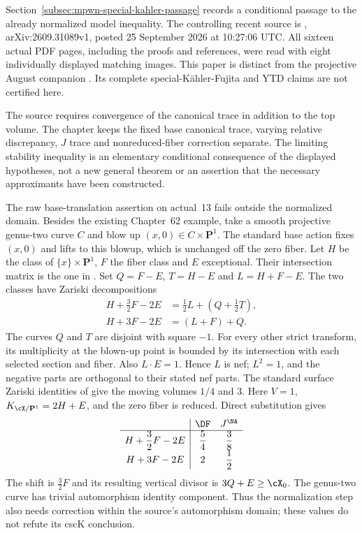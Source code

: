 Section~\ref{subsec:mpwn-special-kahler-passage} records a
conditional passage to the already normalized model inequality.
The controlling recent source is \cite{Trusiani26TranscendentalV1},
arXiv:\allowbreak 2609.31089v1, posted 25 September 2026 at
10:27:06 UTC. All sixteen actual PDF pages, including the
proofs and references, were read with eight individually displayed
matching images. This paper is distinct from the projective
August companion \cite{Trusiani26}. Its complete special-K\"ahler-Fujita
and YTD claims are not certified here.

The source requires convergence of the canonical trace in
addition to the top volume. The chapter keeps the fixed base
canonical trace, varying relative discrepancy, $J$ trace and
nonreduced-fiber correction separate. The limiting stability
inequality is an elementary conditional consequence of the
displayed hypotheses, not a new general theorem or an assertion
that the necessary approximants have been constructed.

The raw base-translation assertion on actual~13 fails outside
the normalized domain. Besides the existing Chapter~62 example,
take a smooth projective genus-two curve $C$ and blow up
$(x,0)\in C\times\mathbf P^1$. The standard base action fixes
$(x,0)$ and lifts to this blowup, which is unchanged off the
zero fiber. Let $H$ be the class of $\{x\}\times\mathbf P^1$,
$F$ the fiber class and $E$ exceptional.
Their intersection matrix is the one in
.
Set $Q=F-E$, $T=H-E$ and $L=H+F-E$. The two classes have
Zariski decompositions
\[
 \begin{aligned}
 H+\tfrac32F-2E&=\tfrac12L+(Q+\tfrac12T),\\
 H+3F-2E&=(L+F)+Q.
 \end{aligned}
\]
The curves $Q$ and $T$ are disjoint with square $-1$.
For every other strict transform, its multiplicity at the blown-up
point is bounded by its intersection with each selected section
and fiber. Also $L\cdot E=1$. Hence $L$ is nef; $L^2=1$, and the negative parts
are orthogonal to their stated nef parts. The standard surface
Zariski identities of \cite{Bou04} give the moving volumes
$1/4$ and $3$. Here $V=1$, $K_{\cX/\mathbf P^1}=2H+E$,
and the zero fiber is reduced. Direct substitution gives
\begingroup
\renewcommand{\arraystretch}{1.6}
\[
 \begin{array}{c|cc}
 &\DF&J^{\NA}\\ \hline
 H+\dfrac32F-2E&\dfrac54&\dfrac38\\
 H+3F-2E&2&\dfrac12
 \end{array}
\]
\endgroup
The shift is $\frac32F$ and its resulting vertical divisor
is $3Q+E\geq\cX_0$. The genus-two curve has trivial
automorphism identity component. Thus the normalization step
also needs correction within the source's automorphism domain;
these values do not refute its cscK conclusion.

